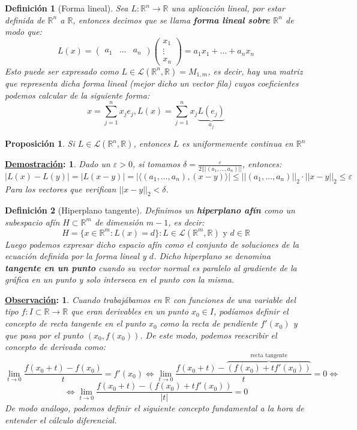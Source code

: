 \documentclass[10pt,a4paper,openright]{book}
\theoremstyle{break}
\newtheorem*{defi}{Definición}
\newtheorem*{prop}{Proposición}
\newtheorem*{demo}{\underline{Demostración}:}
\newtheorem*{obs}{\underline{Observación}:}
\begin{document}
\begin{defi}[Forma lineal]
Sea $L: \mathbb{R}^n \to \mathbb{R}$ una aplicación lineal, por estar definida de $\mathbb{R}^n$ a $\mathbb{R}$, entonces decimos que se llama \textbf{forma lineal sobre $\mathbb{R}^n$} de modo que:
$$L(x) = \begin{pmatrix}
a_1 & \ldots & a_n
\end{pmatrix} \begin{pmatrix}
x_1 \\ \vdots \\ x_n
\end{pmatrix}
 = a_1 x_1 + \ldots + a_n x_n$$
Esto puede ser expresado como $L \in \mathcal{L}(\mathbb{R}^n, \mathbb{R}) = M_{1,m}$, es decir, hay una matriz que representa dicha forma lineal (mejor dicho un vector fila) cuyos coeficientes podemos calcular de la siguiente forma:
$$x = \sum_{j=1}^{n} x_j e_j , L(x) = \sum_{j=1}^{n} x_j \underbrace{L(e_j)}_{a_j}$$
\end{defi}

\begin{prop}
Si $L \in \mathcal{L} (\mathbb{R}^n, \mathbb{R})$, entonces $L$ es uniformemente continua en $\mathbb{R}^n$
\end{prop}

\begin{demo}
Dado un $\varepsilon >0$, si tomamos $\delta = \frac{\varepsilon}{2||| (a_1, \ldots, a_n)||}$, entonces:
$$|L(x) - L(y)| = |L(x-y)| = |\langle (a_1, \ldots, a_n), (x-y)\rangle| \leq || (a_1, \ldots, a_n)||_2 \cdot || x-y||_2 \leq \varepsilon$$
Para los vectores que verifican $|| x-y||_2 < \delta$.
\end{demo}

\begin{defi}[Hiperplano tangente]
Definimos un \textbf{hiperplano afín} como un subespacio afín $H \subset \mathbb{R}^m$ de dimensión $m-1$, es decir:
$$H = \{x \in \mathbb{R}^m : L(x) = d \} : L \in \mathcal{L}(\mathbb{R}^m, \mathbb{R}) \mbox{ y } d \in \mathbb{R}$$
Luego podemos expresar dicho espacio afín como el conjunto de soluciones de la ecuación definida por la forma lineal y $d$. Dicho hiperplano se denomina \textbf{tangente en un punto} cuando su vector normal es paralelo al gradiente de la gráfica en un punto y solo interseca en el punto con la misma.
\end{defi}

\begin{obs}
Cuando trabajábamos en $\mathbb{R}$ con funciones de una variable del tipo $f: I \subset \mathbb{R} \to \mathbb{R}$ que eran derivables en un punto $x_0 \in I$, podíamos definir el concepto de recta tangente en el punto $x_0$ como la recta de pendiente $f'(x_0)$ y que pasa por el punto $(x_0, f(x_0))$. De este modo, podemos reescribir el concepto de derivada como:
$$  \lim_{t\rightarrow 0} \frac{f(x_0 + t) - f(x_0)}{t} = f'(x_0) \Leftrightarrow \lim_{t\rightarrow 0} \frac{f(x_0 + t) - \overbrace{(f(x_0) + tf'(x_0))}^{\mbox{recta tangente}}}{t} = 0 \Leftrightarrow$$
$$ \Leftrightarrow \lim_{t\rightarrow 0} \frac{f(x_0 + t) - (f(x_0) + tf'(x_0))}{|t|} = 0$$
De modo análogo, podemos definir el siguiente concepto fundamental a la hora de entender el cálculo diferencial.
\end{obs}
\end{document}
